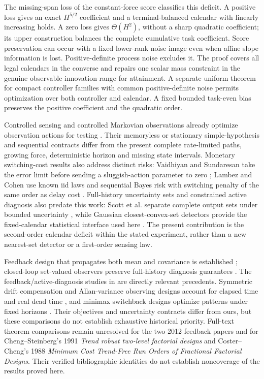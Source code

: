 \documentclass[journal]{IEEEtran}
\begin{document}
The missing-span loss of the constant-force score classifies this deficit.
A positive loss gives an exact $H^{5/2}$ coefficient and a terminal-balanced
calendar with linearly increasing holds. A zero loss gives $\Theta(H^2)$,
without a sharp quadratic coefficient; its upper construction balances the
complete cumulative task coefficient. Score preservation can occur with a
fixed lower-rank noise image even when affine slope information is lost.
Positive-definite process noise excludes it. The proof covers all legal calendars
in the converse and repairs one scalar mass constraint in the genuine observable
innovation range for attainment. A separate uniform theorem for compact
controller families with common positive-definite noise permits optimization
over both controller and calendar. A fixed bounded task-even bias preserves
the positive coefficient and the quadratic order.

Controlled sensing and controlled Markovian observations already optimize
observation actions for testing \cite{controlled,markov}. Their memoryless or
stationary simple-hypothesis and sequential contracts differ from the present
complete rate-limited paths, growing force, deterministic horizon and missing
state intervals. Monetary switching-cost results also address distinct risks:
Vaidhiyan and Sundaresan take the error limit before sending a sluggish-action
parameter to zero \cite{switchcost}; Lambez and Cohen use known iid laws and
sequential Bayes risk with switching penalty of the same order as delay cost
\cite{multipleplays}. Full-history uncertainty sets and constrained active diagnosis
also predate this work: Scott et al. separate complete output sets under bounded
uncertainty \cite{zonotope}, while Gaussian closest-convex-set detectors provide
the fixed-calendar statistical interface used here \cite{convex}.
The present contribution is the second-order calendar deficit within the stated
experiment, rather than a new nearest-set detector or a first-order sensing law.

Feedback design that propagates both mean and covariance is established
\cite{kim}; closed-loop set-valued observers preserve full-history diagnosis
guarantees \cite{closedset}. The feedback/active-diagnosis studies in
\cite{feedback2012,robustfeedback2012} are directly relevant precedents.
Symmetric drift compensation and Allan-variance observing designs account for
elapsed time and real dead time \cite{allan,ossenkopf}, and minimax switchback designs
optimize patterns under fixed horizons \cite{switchback}. Their objectives and
uncertainty contracts differ from ours, but these comparisons do not establish
exhaustive historical priority. Full-text theorem comparisons remain unresolved
for the two 2012 feedback papers and for Cheng--Steinberg's 1991
\emph{Trend robust two-level factorial designs} and Coster--Cheng's 1988
\emph{Minimum Cost Trend-Free Run Orders of Fractional Factorial Designs}.
Their verified bibliographic identities do not establish noncoverage of the
results proved here.
\end{document}
